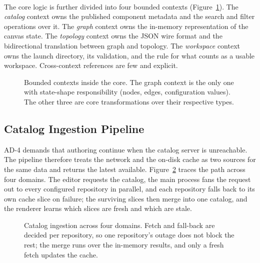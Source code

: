 \paragraph{}
The core logic is further divided into four bounded contexts (Figure~\ref{fig:bounded-contexts}). The \textit{catalog} context owns the published component metadata and the search and filter operations over it. The \textit{graph} context owns the in-memory representation of the canvas state. The \textit{topology} context owns the JSON wire format and the bidirectional translation between graph and topology. The \textit{workspace} context owns the launch directory, its validation, and the rule for what counts as a usable workspace. Cross-context references are few and explicit.

\begin{figure}[H]
    \centering
    \resizebox{0.85\textwidth}{!}{
        
    }
    \caption[Bounded contexts inside the core.]{Bounded contexts inside the core. The graph context is the only one with state-shape responsibility (nodes, edges, configuration values). The other three are core transformations over their respective types.}
    \label{fig:bounded-contexts}
\end{figure}

\FloatBarrier

\subsection{Catalog Ingestion Pipeline}
\label{sec:catalog-ingestion}
AD-4 demands that authoring continue when the catalog server is unreachable. The pipeline therefore treats the network and the on-disk cache as two sources for the same data and returns the latest available. Figure~\ref{fig:catalog-pipeline} traces the path across four domains. The editor requests the catalog, the main process fans the request out to every configured repository in parallel, and each repository falls back to its own cache slice on failure; the surviving slices then merge into one catalog, and the renderer learns which slices are fresh and which are stale.

\begin{figure}[H]
    \centering
    \resizebox{0.95\textwidth}{!}{
        
    }
    \caption[Catalog ingestion across four domains.]{Catalog ingestion across four domains. Fetch and fall-back are decided per repository, so one repository's outage does not block the rest; the merge runs over the in-memory results, and only a fresh fetch updates the cache.}
    \label{fig:catalog-pipeline}
\end{figure}

